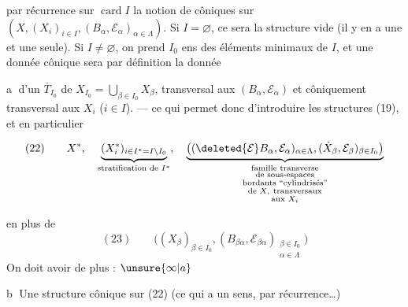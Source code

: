 par récurrence sur $\operatorname{card}I$ la notion de
  côniques sur 
$(X,(X_i)_{i\in I},(B_\alpha,\mathcal E_\alpha)_{\alpha\in\Lambda})$.
 Si $I=\varnothing$, ce sera la structure
vide (il y en a une et une seule). Si
$I\ne\varnothing$, on prend $I_0$ ens des éléments minimaux
de $I$, et une donnée cônique sera par
définition la donnée

\textcircled{a} d'un  $\overline T_{I_0}$
de  $X_{I_0}=\bigcup_{\beta\in I_0}X_\beta$,
transversal aux $(B_\alpha,\mathcal E_\alpha)$ et
côniquement transversal aux $X_i$ ($i\in I$).
--- ce qui permet donc d'introduire les
structures (19), et en particulier

\[
(22)\qquad
X^*,\quad
\underbrace{(X_i^*)_{i\in I^*=I\setminus I_0}}
_{\text{stratification de }I^*},
\quad
\underbrace{\big((\deleted{\mathcal E}B_\alpha,\mathcal E_\alpha)_{\alpha\in\Lambda},
(\dot X_\beta,\mathcal E_\beta)_{\beta\in I_0}\big)}
_{\substack{\text{famille transverse}\\\text{de sous-espaces}\\
\text{bordants ``cylindrisés''}\\
\text{de }X,\ \text{transversaux}\\\text{aux }X_i}}
\]

en plus de
\[
(23)\qquad
\big((X_\beta)_{\beta\in I_0},
(B_{\beta\alpha},\mathcal E_{\beta\alpha})_{\substack{\beta\in I_0\\\alpha\in\Lambda}}\big)
\]
On doit avoir de plus : $\unsure{\infty|a}$

\textcircled{b} Une structure cônique sur (22) (ce qui
a un sens, par récurrence\ldots)
